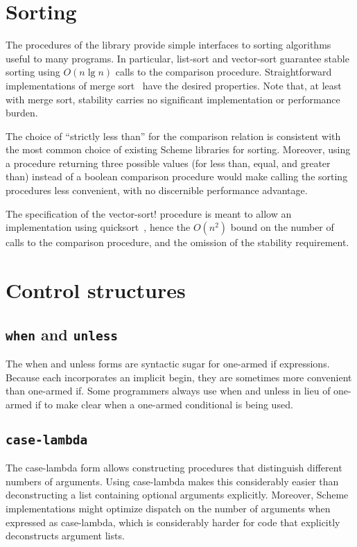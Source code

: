 \documentclass[twoside,twocolumn]{algol60}
\begin{document}
\chapter{Sorting}

The procedures of the  library provide simple
interfaces to sorting algorithms useful to many programs.  In
particular, {\cf list-sort} and {\cf vector-sort} guarantee stable
sorting using $O(n \lg n)$ calls to the comparison procedure.
Straightforward implementations of merge sort~\cite{algorithms} have
the desired properties.  Note that, at least with merge sort,
stability carries no significant implementation or performance burden.

The choice of ``strictly less than'' for the comparison relation is
consistent with the most common choice of existing Scheme libraries
for sorting.  Moreover, using a procedure returning three possible
values (for less than, equal, and greater than) instead of a boolean
comparison procedure would make calling the sorting procedures less
convenient, with no discernible performance advantage.

The specification of the {\cf vector-sort!} procedure is meant to
allow an implementation using quicksort~\cite{quicksort}, hence the $O(n^2)$
bound on the number of calls to the comparison procedure, and the
omission of the stability requirement.

\chapter{Control structures}

\section{{\tt when} and {\tt unless}}

The {\cf when} and {\cf unless} forms are syntactic sugar for one-armed
{\cf if} expressions.
Because each incorporates an implicit {\cf begin}, they are sometimes more
convenient than one-armed {\cf if}.
Some programmers always use {\cf when} and {\cf unless} in lieu of
one-armed {\cf if} to make clear when a one-armed conditional is being
used.

\section{{\tt case-lambda}}

The {\cf case-lambda} form allows constructing procedures that
distinguish different numbers of arguments.  Using {\cf case-lambda}
makes this considerably easier than deconstructing a list containing
optional arguments explicitly.  Moreover, Scheme implementations might
optimize dispatch on the number of arguments when expressed as {\cf
  case-lambda}, which is considerably harder for code that explicitly
deconstructs argument lists.
\end{document}
